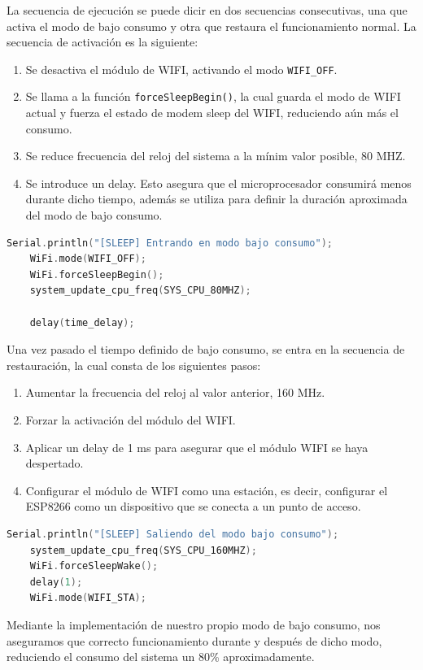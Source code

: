 La secuencia de ejecución se puede dicir en dos secuencias consecutivas, una que activa el modo de bajo consumo y otra que restaura el funcionamiento normal. La secuencia de activación es la siguiente:

\begin{enumerate}
    \item Se desactiva el módulo de WIFI, activando el modo \texttt{WIFI\_OFF}.
    \item Se llama a la función \texttt{forceSleepBegin()}, la cual guarda el modo de WIFI actual y fuerza el estado de modem sleep del WIFI, reduciendo aún más el consumo.
    \item Se reduce frecuencia del reloj del sistema a la mínim valor posible, 80 MHZ.
    \item Se introduce un delay. Esto asegura que el microprocesador consumirá menos durante dicho tiempo, además se utiliza para definir la duración aproximada del modo de bajo consumo.
\end{enumerate}

\begin{lstlisting}[captionpos=b, caption={Activación modo bajo consumo}, language=c++]
    Serial.println("[SLEEP] Entrando en modo bajo consumo");
    WiFi.mode(WIFI_OFF);
    WiFi.forceSleepBegin();
    system_update_cpu_freq(SYS_CPU_80MHZ);

    delay(time_delay);
\end{lstlisting}

Una vez pasado el tiempo definido de bajo consumo, se entra en la secuencia de restauración, la cual consta de los siguientes pasos:

\begin{enumerate}
    \item Aumentar la frecuencia del reloj al valor anterior, 160 MHz.
    \item Forzar la activación del módulo del WIFI.
    \item Aplicar un delay de 1 ms para asegurar que el módulo WIFI se haya despertado.
    \item Configurar el módulo de WIFI como una estación, es decir, configurar el ESP8266 como un dispositivo que se conecta a un punto de acceso.
\end{enumerate}

\begin{lstlisting}[captionpos=b, caption={Restauración modo bajo consumo}, language=c++]
    Serial.println("[SLEEP] Saliendo del modo bajo consumo");
    system_update_cpu_freq(SYS_CPU_160MHZ);
    WiFi.forceSleepWake();
    delay(1);
    WiFi.mode(WIFI_STA);
\end{lstlisting}

Mediante la implementación de nuestro propio modo de bajo consumo, nos aseguramos que correcto funcionamiento durante y después de dicho modo, reduciendo el consumo del sistema un 80\% aproximadamente.